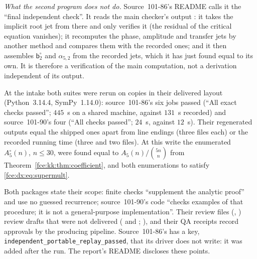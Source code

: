 \documentclass[11pt,a4paper]{article}
\numberwithin{equation}{section}
\theoremstyle{definition}\newtheorem{definition}[theorem]{Definition}
\theoremstyle{remark}\newtheorem{remark}[theorem]{Remark}
\begin{document}
\emph{What the second program does not do.} Source~101-86's README calls it
the ``final independent check''. It reads the main checker's output
: it takes the implicit root jet from there and
only verifies it (the residual of the critical equation vanishes); it
recomputes the phase, amplitude and transfer jets by another method and
compares them with the recorded ones; and it then assembles
$\mathsf b^\circ_2$ and $\alpha_{5,2}$ from the recorded jets, which it has
just found equal to its own. It is therefore a verification of the main
computation, not a derivation independent of its output.

At the intake both suites were rerun on copies in their delivered layout
(Python~3.14.4, SymPy~1.14.0): source~101-86's six jobs passed (``All exact
checks passed''; $445$~s on a shared machine, against $131$~s recorded) and
source~101-90's four (``All checks passed''; $24$~s, against $12$~s). Their
regenerated outputs equal the shipped ones apart from line endings (three
files each) or the recorded running time (three and two files). At this write
the enumerated $A^\circ_5(n)$, $n\le30$, were found equal to
$A_5(n)/\binom{5n}n$ from Theorem~\ref{fce:kk:thm:coefficient}, and both
enumerations to satisfy \eqref{fce:dx:eq:supermult}.

Both packages state their scope: finite checks ``supplement the analytic
proof'' and use no guessed recurrence; source~101-90's code ``checks examples
of that procedure; it is not a general-purpose implementation''. Their review
files (,
) review drafts that were not delivered
( and ;
), and their QA receipts record approvals by the
producing pipeline. Source~101-86's  has a key,
\texttt{independent\_portable\_replay\_passed}, that its driver does not write:
it was added after the run. The report's README discloses these points.
\end{document}
